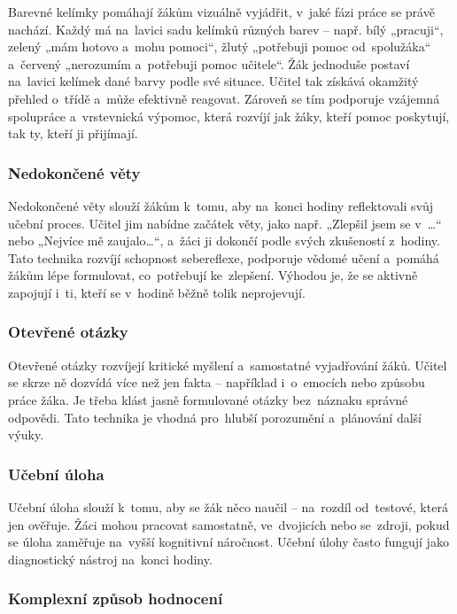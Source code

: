 \documentclass[male,czech,api_bc]{kitheses}
\begin{document}
Barevné kelímky pomáhají žákům vizuálně vyjádřit, v~jaké fázi práce se právě nachází. Každý má na~lavici sadu kelímků různých barev – např. bílý „pracuji“, zelený „mám hotovo a~mohu pomoci“, žlutý „potřebuji pomoc od~spolužáka“ a~červený „nerozumím a~potřebuji pomoc učitele“. Žák jednoduše postaví na~lavici kelímek dané barvy podle své situace. Učitel tak získává okamžitý přehled o~třídě a~může efektivně reagovat. Zároveň se tím podporuje vzájemná spolupráce a~vrstevnická výpomoc, která rozvíjí jak žáky, kteří pomoc poskytují, tak ty, kteří ji přijímají.

\subsubsection{Nedokončené věty}

Nedokončené věty slouží žákům k~tomu, aby na~konci hodiny reflektovali svůj učební proces. Učitel jim nabídne začátek věty, jako např. „Zlepšil jsem se v~…“ nebo „Nejvíce mě zaujalo…“, a~žáci ji dokončí podle svých zkušeností z~hodiny. Tato technika rozvíjí schopnost sebereflexe, podporuje vědomé učení a~pomáhá žákům lépe formulovat, co~potřebují ke~zlepšení. Výhodou je, že se aktivně zapojují i~ti, kteří se v~hodině běžně tolik neprojevují.

\subsubsection{Otevřené otázky}

Otevřené otázky rozvíjejí kritické myšlení a~samostatné vyjadřování žáků. Učitel se skrze ně dozvídá více než jen fakta – například i~o~emocích nebo způsobu práce žáka. Je třeba klást jasně formulované otázky bez~náznaku správné odpovědi. Tato technika je vhodná pro~hlubší porozumění a~plánování další výuky.

\subsubsection{Učební úloha}

Učební úloha slouží k~tomu, aby se žák něco naučil – na~rozdíl od~testové, která jen ověřuje. Žáci mohou pracovat samostatně, ve~dvojicích nebo se~zdroji, pokud se úloha zaměřuje na~vyšší kognitivní náročnost. Učební úlohy často fungují jako diagnostický nástroj na~konci hodiny.

\subsubsection{Komplexní způsob hodnocení}
\end{document}
